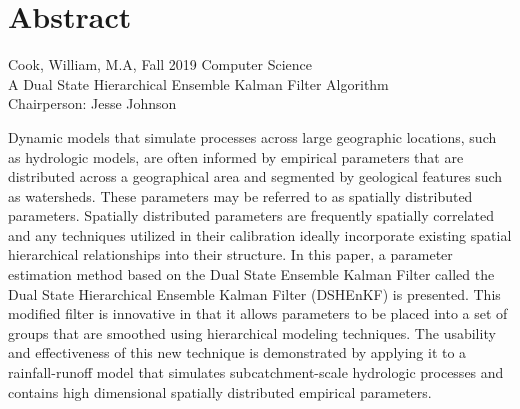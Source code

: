 \documentclass[12pt,twoside]{mitthesis}
\begin{document}
\pagestyle{plain}




\section{Abstract}
Cook, William, M.A, Fall 2019 \hfill Computer Science
\\
\vspace{5mm}
A Dual State Hierarchical Ensemble Kalman Filter Algorithm
\\
\vspace{5mm}
Chairperson: Jesse Johnson
\\
\vspace{5mm}

Dynamic models that simulate processes across large geographic locations, such as hydrologic models, are often informed by empirical parameters that are distributed across a geographical area and segmented by geological features such as watersheds. These parameters may be referred to as spatially distributed parameters. Spatially distributed parameters are frequently spatially correlated and any techniques utilized in their calibration ideally incorporate existing spatial hierarchical relationships into their structure. In this paper, a parameter estimation method based on the Dual State Ensemble Kalman Filter called the Dual State Hierarchical Ensemble Kalman Filter (DSHEnKF) is presented. This modified filter is innovative in that it allows parameters to be placed into a set of groups that are smoothed using hierarchical modeling techniques. The usability and effectiveness of this new technique is demonstrated by applying it to a rainfall-runoff model that simulates subcatchment-scale hydrologic processes and contains high dimensional spatially distributed empirical parameters.







\appendix
%

%

\end{document}
